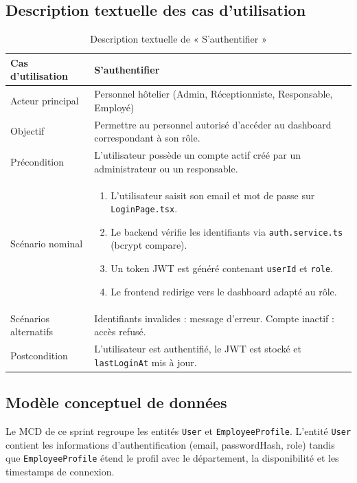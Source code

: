 \subsection{Description textuelle des cas d'utilisation}
\begin{table}[H]
\centering
\caption{Description textuelle de « S'authentifier »}
\small
\begin{tabularx}{\textwidth}{|p{3.5cm}|X|}
\hline
Cas d'utilisation & S'authentifier \\ \hline
Acteur principal & Personnel hôtelier (Admin, Réceptionniste, Responsable, Employé) \\ \hline
Objectif & Permettre au personnel autorisé d'accéder au dashboard correspondant à son rôle. \\ \hline
Précondition & L'utilisateur possède un compte actif créé par un administrateur ou un responsable. \\ \hline
Scénario nominal &
\begin{enumerate}[nosep]
\item L'utilisateur saisit son email et mot de passe sur \texttt{LoginPage.tsx}.
\item Le backend vérifie les identifiants via \texttt{auth.service.ts} (bcrypt compare).
\item Un token JWT est généré contenant \texttt{userId} et \texttt{role}.
\item Le frontend redirige vers le dashboard adapté au rôle.
\end{enumerate} \\ \hline
Scénarios alternatifs & Identifiants invalides : message d'erreur. Compte inactif : accès refusé. \\ \hline
Postcondition & L'utilisateur est authentifié, le JWT est stocké et \texttt{lastLoginAt} mis à jour. \\ \hline
\end{tabularx}
\end{table}

\subsection{Modèle conceptuel de données}
Le MCD de ce sprint regroupe les entités \texttt{User} et \texttt{EmployeeProfile}. L'entité \texttt{User} contient les informations d'authentification (email, passwordHash, role) tandis que \texttt{EmployeeProfile} étend le profil avec le département, la disponibilité et les timestamps de connexion.



